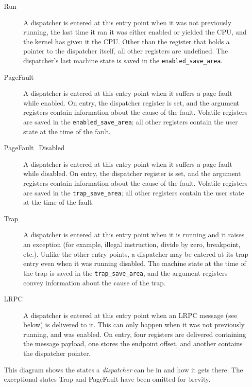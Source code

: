 \documentclass{scrreprt}
\begin{document}
  \begin{description}
  \item[Run] A dispatcher is entered at this entry point when it was
    not previously running, the last time it ran it was either enabled or
    yielded the CPU, and the kernel has given it the CPU. Other than the
    register that holds a pointer to the dispatcher itself, all other registers
    are undefined. The dispatcher's last machine state is saved in the
    \lstinline+enabled_save_area+.

  \item[PageFault] A dispatcher is entered at this entry point when it
    suffers a page fault while enabled. On entry, the dispatcher register is
    set, and the argument registers contain information about the cause of
    the fault. Volatile registers are saved in the
    \lstinline+enabled_save_area+; all other registers contain the user
    state at the time of the fault.

  \item[PageFault\_Disabled] A dispatcher is entered at this entry point when it
    suffers a page fault while disabled. On entry, the dispatcher register is
    set, and the argument registers contain information about the cause of
    the fault. Volatile registers are saved in the
    \lstinline+trap_save_area+; all other registers contain the user
    state at the time of the fault.

  \item[Trap] A dispatcher is entered at this entry point when it is
    running and it raises an exception (for example, illegal
    instruction, divide by zero, breakpoint, etc.). Unlike the other
    entry points, a dispatcher may be entered at its trap entry even
    when it was running disabled. The machine state at the time of the
    trap is saved in the \lstinline+trap_save_area+, and the argument
    registers convey information about the cause of the trap.

  \item[LRPC] A dispatcher is entered at this entry point when an
    LRPC message (see below) is delivered to it. This can only
    happen when it was not previously running, and was enabled. On
    entry, four registers are delivered containing the message payload,
    one stores the endpoint offset, and another contains the dispatcher pointer.
  \end{description}

  This diagram shows the states a \emph{dispatcher} can be in and how it
  gets there. The exceptional states Trap and PageFault have been
  omitted for brevity.
\end{document}
